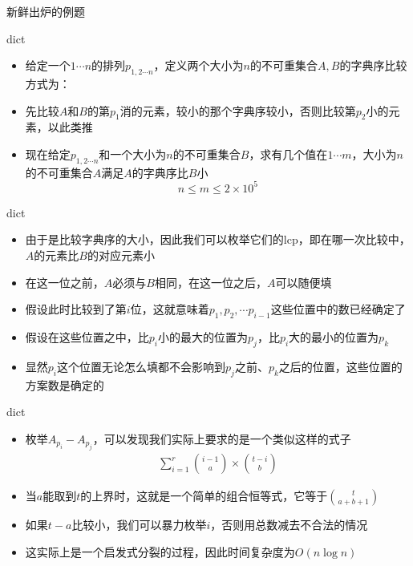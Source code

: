 \documentclass{beamer}
\begin{document}
\begin{frame}{新鲜出炉的例题}
    \begin{block}{dict}
        \begin{itemize}
            \item 给定一个$1\cdots n$的排列$p_{1,2\cdots n}$，定义两个大小为$n$的不可重集合$A,B$的字典序比较方式为：
            \item 先比较$A$和$B$的第$p_1$消的元素，较小的那个字典序较小，否则比较第$p_2$小的元素，以此类推
            \item 现在给定$p_{1,2\cdots n}$和一个大小为$n$的不可重集合$B$，求有几个值在$1\cdots m$，大小为$n$的不可重集合$A$满足$A$的字典序比$B$小
            $$n\leq m\leq 2\times 10^5$$
        \end{itemize}
    \end{block}
\end{frame}

\begin{frame}{dict}
    \begin{itemize}
        \item 由于是比较字典序的大小，因此我们可以枚举它们的lcp，即在哪一次比较中，$A$的元素比$B$的对应元素小 \pause
        \item 在这一位之前，$A$必须与$B$相同，在这一位之后，$A$可以随便填 \pause
        \item 假设此时比较到了第$i$位，这就意味着$p_1,p_2,\cdots p_{i - 1}$这些位置中的数已经确定了 \pause
        \item 假设在这些位置之中，比$p_i$小的最大的位置为$p_j$，比$p_i$大的最小的位置为$p_k$ \pause
        \item 显然$p_i$这个位置无论怎么填都不会影响到$p_j$之前、$p_k$之后的位置，这些位置的方案数是确定的
    \end{itemize}
\end{frame}

\begin{frame}{dict}
    \begin{itemize}
        \item 枚举$A_{p_i} - A_{p_j}$，可以发现我们实际上要求的是一个类似这样的式子 \pause
        $$\begin{aligned}
            \sum_{i = 1}^r {i - 1\choose a} \times {t - i\choose b}
        \end{aligned}$$ \pause
        \item 当$a$能取到$t$的上界时，这就是一个简单的组合恒等式，它等于${t\choose a + b + 1}$ \pause
        \item 如果$t - a$比较小，我们可以暴力枚举$i$，否则用总数减去不合法的情况 \pause
        \item 这实际上是一个启发式分裂的过程，因此时间复杂度为$O(n\log n)$
    \end{itemize}
\end{frame}
\end{document}
